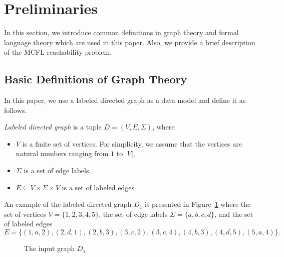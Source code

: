 \section{Preliminaries}
\label{sec:preliminaries}

In this section, we introduce common definitions in graph theory and formal language theory which are used in this paper.
Also, we provide a brief description of the MCFL-reachability problem.

\subsection{Basic Definitions of Graph Theory}

In this paper, we use a labeled directed graph as a data model and define it as follows.
\begin{definition} \emph{Labeled directed graph} is a tuple $D = (V, E, \Sigma)$, where
\begin{itemize}
    \item $V$ is a finite set of vertices. For simplicity, we assume that the vertices are natural numbers ranging from $1$ to $|V|$,
    \item $\Sigma$ is a set of edge labels,
    \item $E \subseteq V \times \Sigma \times V$ is a set of labeled edges.
\end{itemize} 
\end{definition}

An example of the labeled directed graph $D_1$ is presented in Figure~\ref{fig:example_input_graph} where the set of vertices $V = \{1, 2, 3, 4, 5\}$, the set of edge labels $\Sigma = \{a, b, c, d\}$, and the set of labeled edges $$E = \{(1, a, 2), (2, d, 1), (2, b, 3), (3, c, 2), (3, c, 4), (4, b, 3), (4, d, 5), (5, a, 4)\}.$$

\begin{figure}[h]
    \centering
    \caption{The input graph $D_1$}
    \label{fig:example_input_graph}
\end{figure}

